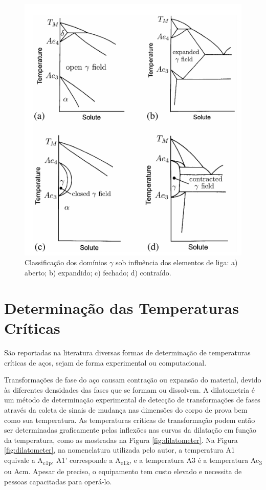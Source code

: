 \documentclass[brazil,tf,epusp]{usp}  %
\begin{document}

\begin{figure}[ht!]
  \includegraphics[width=.7\textwidth]{img/elementos-liga.png}
  \caption{Classificação dos domínios $\gamma$ sob influência dos elementos de liga: a) aberto; b) expandido; c) fechado; d) contraído. \cite{Honeycombe1982}}
  \label{fig:elem-liga}
\end{figure}

\section{Determinação das Temperaturas Críticas}

São reportadas na literatura diversas formas de determinação de temperaturas críticas de aços, sejam de forma experimental ou computacional.

Transformações de fase do aço causam contração ou expansão do material, devido às diferentes densidades das fases que se formam ou dissolvem. A dilatometria é um método de determinação experimental de detecção de transformações de fases através da coleta de sinais de mudança nas dimensões do corpo de prova bem como sua temperatura. As temperaturas críticas de transformação podem então ser determinadas graficamente pelas inflexões nas curvas da dilatação em função da temperatura, como as mostradas na Figura \ref{fig:dilatometer}. Na Figura \ref{fig:dilatometer}, na nomenclatura utilizada pelo autor, a temperatura A1 equivale a A\textsubscript{c1p}, A1' corresponde a A\textsubscript{c1k}, e a temperatura A3 é a temperatura Ac\textsubscript{3} ou Acm. Apesar de preciso, o equipamento tem custo elevado e necessita de pessoas capacitadas para operá-lo.
\end{document}
